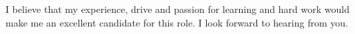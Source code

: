 \documentclass[11pt,a4paper,sans]{moderncv}        %
\newcommand{\company}{MomentFeed}
\begin{document}
I believe that my experience, drive and passion for learning and hard work would make me an excellent candidate for this role. 
I look forward to hearing from you.

\makeletterclosing
\end{document}
